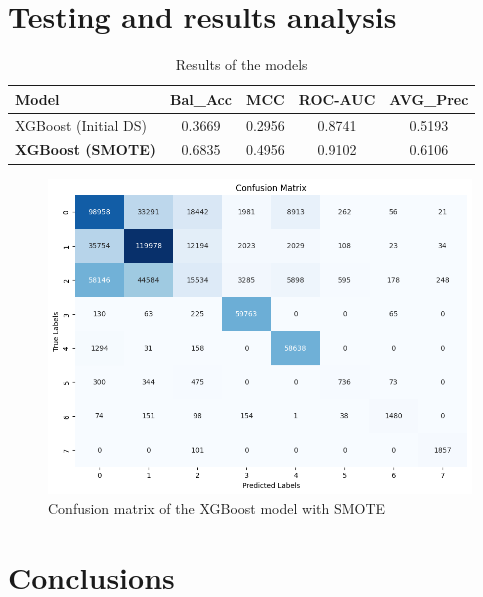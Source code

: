\documentclass[10pt,twocolumn,letterpaper]{article}
\begin{document}
\section{Testing and results analysis}
\begin{table}[h!]
    \centering
    \begin{tabular}{|p{2cm}|c|c|c|c|}
    \hline
    \textbf{Model} & \textbf{Bal\_Acc} & \textbf{MCC} & \textbf{ROC-AUC} & \textbf{AVG\_Prec} \\
    \hline
    XGBoost (Initial DS) & 0.3669 & 0.2956 & 0.8741 & 0.5193 \\
    \hline
    \textbf{XGBoost (SMOTE)} & 0.6835 & 0.4956 & 0.9102 & 0.6106 \\
    \hline
    \end{tabular}
    \caption{Results of the models}
\end{table}

\begin{center}
    \begin{figure}[h!]
        \centering
        \includegraphics[scale=0.4]{img/cmXGBoostSMOTE.png}
        \caption{Confusion matrix of the XGBoost model with SMOTE}
        \label{fig:cmXGBoostSMOTE}
    \end{figure}
\end{center}

\section{Conclusions}

{\small


}
\end{document}
